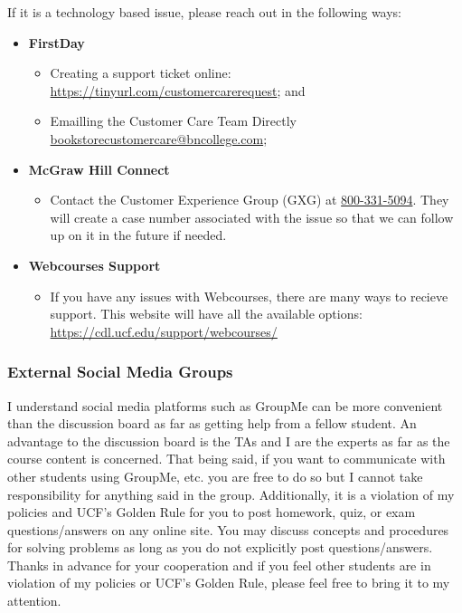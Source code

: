 \documentclass[11pt]{paper}
\begin{document}
If it is a technology based issue, please reach out in the following ways:

\begin{itemize}

\item \textbf{FirstDay\texttrademark}
	\begin{itemize}
	\item Creating a support ticket online: \href{https://tinyurl.com/customercarerequest}{https://tinyurl.com/customercarerequest}; and
	\item Emailling the Customer Care Team Directly \href{mailto:bookstorecustomercare@bncollege.com}{bookstorecustomercare@bncollege.com};
	\end{itemize}

\item \textbf{McGraw Hill Connect}
	\begin{itemize}
	\item Contact the Customer Experience Group (GXG) at \href{tel:800-331-5094}{800-331-5094}. They will create a case number associated with the issue so that we can follow up on it in the future if needed.
	\end{itemize}

\item \textbf{Webcourses Support}
	\begin{itemize}
	\item If you have any issues with Webcourses, there are many ways to recieve support. This website will have all the available options: \href{https://cdl.ucf.edu/support/webcourses/}{https://cdl.ucf.edu/support/webcourses/}
	\end{itemize}

\end{itemize} 


\subsubsection{External Social Media Groups}

I understand social media platforms such as GroupMe can be more convenient than the discussion board as far as getting help from a fellow student.  An advantage to the discussion board is the TAs and I are the experts as far as the course content is concerned. That being said, if you want to communicate with other students using GroupMe, etc. you are free to do so but I cannot take responsibility for anything said in the group.  Additionally, it is a violation of my policies and UCF’s Golden Rule for you to post homework, quiz, or exam questions/answers on any online site. You may discuss concepts and procedures for solving problems as long as you do not explicitly post questions/answers. Thanks in advance for your cooperation and if you feel other students are in violation of my policies or UCF’s Golden Rule, please feel free to bring it to my attention.
\end{document}
